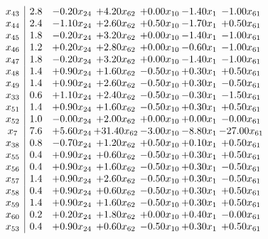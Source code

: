 \documentclass[8pt]{article}
\begin{document}
\[\begin{array}{c| c c@{\hskip 2pt} c@{\hskip 2pt} c@{\hskip 2pt} c@{\hskip 2pt} c@{\hskip 2pt} }
 x_{43}   &  2.8 & -0.20 x_{24} & +  4.20 x_{62} & +  0.00 x_{10} & -1.40 x_{1} & -1.00 x_{61}\\
 x_{44}   &  2.4 & -1.10 x_{24} & +  2.60 x_{62} & +  0.50 x_{10} & -1.70 x_{1} & +  0.50 x_{61}\\
 x_{45}   &  1.8 & -0.20 x_{24} & +  3.20 x_{62} & +  0.00 x_{10} & -1.40 x_{1} & -1.00 x_{61}\\
 x_{46}   &  1.2 & +  0.20 x_{24} & +  2.80 x_{62} & +  0.00 x_{10} & -0.60 x_{1} & -1.00 x_{61}\\
 x_{47}   &  1.8 & -0.20 x_{24} & +  3.20 x_{62} & +  0.00 x_{10} & -1.40 x_{1} & -1.00 x_{61}\\
 x_{48}   &  1.4 & +  0.90 x_{24} & +  1.60 x_{62} & -0.50 x_{10} & +  0.30 x_{1} & +  0.50 x_{61}\\
 x_{49}   &  1.4 & +  0.90 x_{24} & +  2.60 x_{62} & -0.50 x_{10} & +  0.30 x_{1} & -0.50 x_{61}\\
 x_{33}   &  0.6 & +  1.10 x_{24} & +  2.40 x_{62} & -0.50 x_{10} & -0.30 x_{1} & -1.50 x_{61}\\
 x_{51}   &  1.4 & +  0.90 x_{24} & +  1.60 x_{62} & -0.50 x_{10} & +  0.30 x_{1} & +  0.50 x_{61}\\
 x_{52}   &  1.0 & -0.00 x_{24} & +  2.00 x_{62} & +  0.00 x_{10} & +  0.00 x_{1} & -0.00 x_{61}\\
 x_{7}   &  7.6 & +  5.60 x_{24} & + 31.40 x_{62} & -3.00 x_{10} & -8.80 x_{1} & -27.00 x_{61}\\
 x_{38}   &  0.8 & -0.70 x_{24} & +  1.20 x_{62} & +  0.50 x_{10} & +  0.10 x_{1} & +  0.50 x_{61}\\
 x_{55}   &  0.4 & +  0.90 x_{24} & +  0.60 x_{62} & -0.50 x_{10} & +  0.30 x_{1} & +  0.50 x_{61}\\
 x_{56}   &  0.4 & +  0.90 x_{24} & +  1.60 x_{62} & -0.50 x_{10} & +  0.30 x_{1} & -0.50 x_{61}\\
 x_{57}   &  1.4 & +  0.90 x_{24} & +  2.60 x_{62} & -0.50 x_{10} & +  0.30 x_{1} & -0.50 x_{61}\\
 x_{58}   &  0.4 & +  0.90 x_{24} & +  0.60 x_{62} & -0.50 x_{10} & +  0.30 x_{1} & +  0.50 x_{61}\\
 x_{59}   &  1.4 & +  0.90 x_{24} & +  1.60 x_{62} & -0.50 x_{10} & +  0.30 x_{1} & +  0.50 x_{61}\\
 x_{60}   &  0.2 & +  0.20 x_{24} & +  1.80 x_{62} & +  0.00 x_{10} & +  0.40 x_{1} & -0.00 x_{61}\\
 x_{53}   &  0.4 & +  0.90 x_{24} & +  0.60 x_{62} & -0.50 x_{10} & +  0.30 x_{1} & +  0.50 x_{61}\\

\end{array}\]
\end{document}
